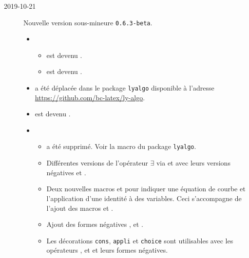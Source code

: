 \documentclass[12pt,a4paper]{book}
\begin{document}
        \begin{description}
\medskip
\item[2019-10-21] Nouvelle version sous-mineure \verb+0.6.3-beta+.

\begin{itemize}[itemsep=.5em]
    \item {}
    \begin{itemize}[itemsep=.5em]
        \item {} est devenu .

        \item {} est devenu .
    \end{itemize}




    \item {}
           a été déplacée dans le package \verb+lyalgo+ disponible à l'adresse \url{https://github.com/bc-latex/ly-algo}.




    \item {}
           est devenu .




    \item {}
    \begin{itemize}[itemsep=.5em]
        \item {} a été supprimé. Voir la macro  du package \verb+lyalgo+.

        \item Différentes versions de l'opérateur $\exists$ via  et  avec leurs versions négatives  et .

        \item Deux nouvelles macros  et  pour indiquer une équation de courbe et l'application d'une identité à des variables. Ceci s'accompagne de l'ajout des macros  et .

        \item Ajout des formes négatives ,  et .

        \item Les décorations \verb+cons+, \verb+appli+ et \verb+choice+ sont utilisables avec les opérateurs ,  et  et leurs formes négatives.


\end{itemize}
\end{itemize}
\end{description}
\end{document}
